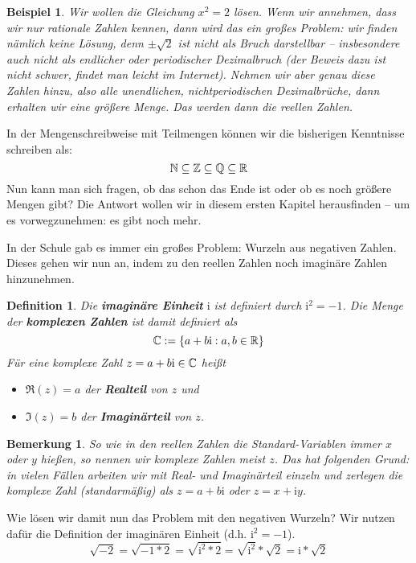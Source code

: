 \documentclass[ngerman, a4paper, 12pt]{scrartcl}
\newcounter{themcount}
\theoremstyle{plain}
\newtheorem{definition}[themcount]{Definition}
\newtheorem{beispiel}[themcount]{Beispiel}
\newtheorem{bemerkung}[themcount]{Bemerkung}
\theoremstyle{proofstyle}
\newcommand{\begriff}[1]{\textbf{#1}}
\renewcommand{\i}{\mathrm{i}}
\begin{document}
	\begin{beispiel}
		Wir wollen die Gleichung $x^2 = 2$ lösen. Wenn wir annehmen, dass wir nur rationale Zahlen kennen, dann wird das ein großes Problem: wir finden nämlich keine Lösung, denn $\pm \sqrt{2}$ ist nicht als Bruch darstellbar -- insbesondere auch nicht als endlicher oder periodischer Dezimalbruch (der Beweis dazu ist nicht schwer, findet man leicht im Internet). Nehmen wir aber genau diese Zahlen hinzu, also alle unendlichen, nichtperiodischen Dezimalbrüche, dann erhalten wir eine größere Menge. Das werden dann die reellen Zahlen. 
	\end{beispiel}

	In der Mengenschreibweise mit Teilmengen können wir die bisherigen Kenntnisse schreiben als:
	\begin{equation*}
		\mathbb{N} \subseteq \mathbb{Z} \subseteq \mathbb{Q} \subseteq \mathbb{R}
	\end{equation*}
	Nun kann man sich fragen, ob das schon das Ende ist oder ob es noch größere Mengen gibt?  Die Antwort wollen wir in diesem ersten Kapitel herausfinden -- um es vorwegzunehmen: es gibt noch mehr.
	
	In der Schule gab es immer ein großes Problem: Wurzeln aus negativen Zahlen. Dieses gehen wir nun an, indem zu den reellen Zahlen noch imaginäre Zahlen hinzunehmen. 
	
	\begin{definition}
		Die \begriff{imaginäre Einheit} $\i$ ist definiert durch $\i^2 = -1$. Die Menge der \begriff{komplexen Zahlen} ist damit definiert als
		\begin{equation*}
			\CC \defeq \menge{a + b \i : a,b \in \R}
		\end{equation*}
		Für eine komplexe Zahl $z = a + b \i \in \CC$ heißt
		\begin{itemize}
			\item $\Re(z) = a$ der \begriff{Realteil} von $z$ und
			\item $\Im(z) = b$ der \begriff{Imaginärteil} von $z$.
		\end{itemize}
	\end{definition}
	
	\begin{bemerkung}
		So wie in den reellen Zahlen die Standard-Variablen immer $x$ oder $y$ hießen, so nennen wir komplexe Zahlen meist $z$. Das hat folgenden Grund: in vielen Fällen arbeiten wir mit Real- und Imaginärteil einzeln und zerlegen die komplexe Zahl (standarmäßig) als $z = a + b \i$ oder $z = x + \i y$. 
	\end{bemerkung}

	Wie lösen wir damit nun das Problem mit den negativen Wurzeln? Wir nutzen dafür die Definition der imaginären Einheit (d.h. $\i^2 = -1$).
	\begin{equation*}
		\sqrt{-2} = \sqrt{-1 * 2} = \sqrt{\i^2 * 2} = \sqrt{\i^2} * \sqrt{2} = \i * \sqrt{2}
	\end{equation*}
	
	
	
\end{document}

